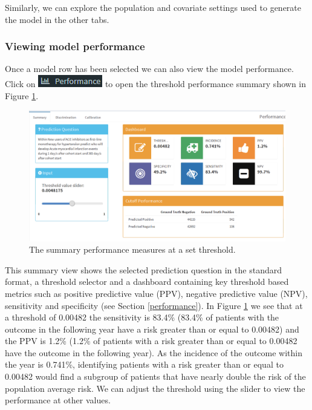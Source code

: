 \documentclass[11pt]{book}
\theoremstyle{definition}
\theoremstyle{definition}
\theoremstyle{definition}
\theoremstyle{remark}
\begin{document}
Similarly, we can explore the population and covariate settings used to generate the model in the other tabs.

\hypertarget{viewing-model-performance}{%
\subsubsection*{Viewing model performance}\label{viewing-model-performance}}

Once a model row has been selected we can also view the model performance. Click on \includegraphics{images/PatientLevelPrediction/performance.png} to open the threshold performance summary shown in Figure \ref{fig:shinyPerformanceSum}.

\begin{figure}

{\centering \includegraphics[width=1\linewidth]{images/PatientLevelPrediction/shiny/shinyPerformanceSum} 

}

\caption{The summary performance measures at a set threshold.}\label{fig:shinyPerformanceSum}
\end{figure}

This summary view shows the selected prediction question in the standard format, a threshold selector and a dashboard containing key threshold based metrics such as positive predictive value (PPV), negative predictive value (NPV), sensitivity and specificity (see Section \ref{performance}). In Figure \ref{fig:shinyPerformanceSum} we see that at a threshold of 0.00482 the sensitivity is 83.4\% (83.4\% of patients with the outcome in the following year have a risk greater than or equal to 0.00482) and the PPV is 1.2\% (1.2\% of patients with a risk greater than or equal to 0.00482 have the outcome in the following year). As the incidence of the outcome within the year is 0.741\%, identifying patients with a risk greater than or equal to 0.00482 would find a subgroup of patients that have nearly double the risk of the population average risk. We can adjust the threshold using the slider to view the performance at other values.
\end{document}

